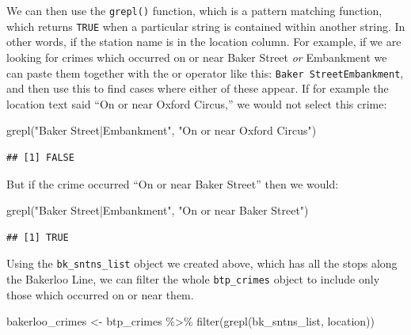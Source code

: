 \documentclass[
  krantz2]{krantz}
\makeatletter
\newenvironment{Shaded}{\begin{snugshade}}{\end{snugshade}}
\newcommand{\FunctionTok}[1]{\textcolor[rgb]{0,0,0}{#1}}
\newcommand{\NormalTok}[1]{#1}
\newcommand{\OtherTok}[1]{\textcolor[rgb]{0.37,0.37,0.37}{#1}}
\newcommand{\SpecialCharTok}[1]{\textcolor[rgb]{0,0,0}{#1}}
\newcommand{\StringTok}[1]{\textcolor[rgb]{0.5,0.5,0.5}{#1}}
\newenvironment{kframe}{%
\medskip{}
\setlength{\fboxsep}{.8em}
 \def\at@end@of@kframe{}%
 \ifinner\ifhmode%
  \def\at@end@of@kframe{\end{minipage}}%
  \begin{minipage}{\columnwidth}%
 \fi\fi%
 \def\FrameCommand##1{\hskip\@totalleftmargin \hskip-\fboxsep
 \colorbox{shadecolor}{##1}\hskip-\fboxsep
     \hskip-\linewidth \hskip-\@totalleftmargin \hskip\columnwidth}%
 \MakeFramed {\advance\hsize-\width
   \@totalleftmargin\z@ \linewidth\hsize
   \@setminipage}}%
 {\par\unskip\endMakeFramed%
 \at@end@of@kframe}
\renewenvironment{Shaded}{\begin{kframe}}{\end{kframe}}
\makeatother
\begin{document}
We can then use the \texttt{grepl()} function, which is a pattern matching function, which returns \texttt{TRUE} when a particular string is contained within another string. In other words, if the station name is in the location column. For example, if we are looking for crimes which occurred on or near Baker Street \emph{or} Embankment we can paste them together with the or operator like this: \texttt{Baker\ Street\textbar{}Embankment}, and then use this to find cases where either of these appear. If for example the location text said ``On or near Oxford Circus,'' we would not select this crime:

\begin{Shaded}
\begin{Highlighting}[]
\FunctionTok{grepl}\NormalTok{(}\StringTok{"Baker Street|Embankment"}\NormalTok{, }\StringTok{"On or near Oxford Circus"}\NormalTok{)}
\end{Highlighting}
\end{Shaded}

\begin{verbatim}
## [1] FALSE
\end{verbatim}

But if the crime occurred ``On or near Baker Street'' then we would:

\begin{Shaded}
\begin{Highlighting}[]
\FunctionTok{grepl}\NormalTok{(}\StringTok{"Baker Street|Embankment"}\NormalTok{, }\StringTok{"On or near Baker Street"}\NormalTok{)}
\end{Highlighting}
\end{Shaded}

\begin{verbatim}
## [1] TRUE
\end{verbatim}

Using the \texttt{bk\_sntns\_list} object we created above, which has all the stops along the Bakerloo Line, we can filter the whole \texttt{btp\_crimes} object to include only those which occurred on or near them.

\begin{Shaded}
\begin{Highlighting}[]
\NormalTok{bakerloo\_crimes }\OtherTok{\textless{}{-}}\NormalTok{ btp\_crimes }\SpecialCharTok{\%\textgreater{}\%} 
  \FunctionTok{filter}\NormalTok{(}\FunctionTok{grepl}\NormalTok{(bk\_sntns\_list, location))}
\end{Highlighting}
\end{Shaded}
\end{document}
